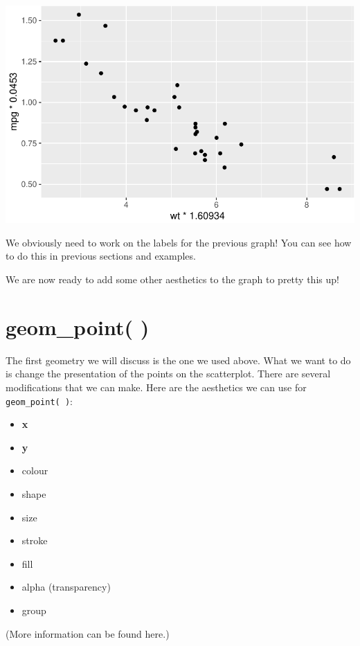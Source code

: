 \documentclass[
  letterpaper,
  DIV=11,
  numbers=noendperiod]{scrreprt}
\begin{document}
\includegraphics{Advanced_Scatterplot_Techniques_files/figure-pdf/unnamed-chunk-4-1.pdf}

We obviously need to work on the labels for the previous graph! You can
see how to do this in previous sections and examples.

We are now ready to add some other aesthetics to the graph to pretty
this up!

\section*{geom\_point( )}\label{geom_point}


The first geometry we will discuss is the one we used above. What we
want to do is change the presentation of the points on the scatterplot.
There are several modifications that we can make. Here are the
aesthetics we can use for \texttt{geom\_point(\ )}:

\begin{itemize}
\item
  \textbf{x}
\item
  \textbf{y}
\item
  colour
\item
  shape
\item
  size
\item
  stroke
\item
  fill
\item
  alpha (transparency)
\item
  group
\end{itemize}

(More information can be found here.)
\end{document}
